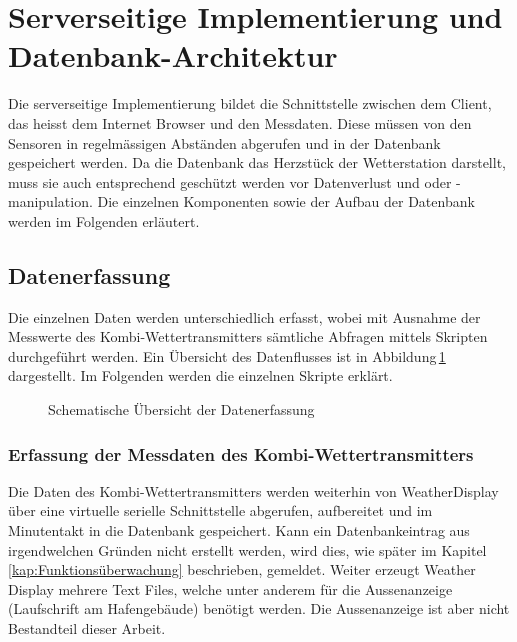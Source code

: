 \section{Serverseitige Implementierung und Datenbank-Architektur}
Die serverseitige Implementierung bildet die Schnittstelle zwischen dem Client, das heisst dem Internet Browser und den Messdaten. Diese müssen von den Sensoren in regelmässigen Abständen abgerufen und in der Datenbank gespeichert werden. Da die Datenbank das Herzstück der Wetterstation darstellt, muss sie auch entsprechend geschützt werden vor Datenverlust und oder -manipulation. Die einzelnen Komponenten sowie der Aufbau der Datenbank werden im Folgenden erläutert.

\subsection{Datenerfassung}
Die einzelnen Daten werden unterschiedlich erfasst, wobei mit Ausnahme der Messwerte des Kombi-Wettertransmitters sämtliche Abfragen mittels Skripten durchgeführt werden. Ein Übersicht des Datenflusses ist in Abbildung\,\ref{img:datenerfassung} dargestellt. Im Folgenden werden die einzelnen Skripte erklärt.

\begin{figure}[htbp!]
	\centering
	\caption{Schematische Übersicht der Datenerfassung}
	\label{img:datenerfassung}
\end{figure}


\subsubsection{Erfassung der Messdaten des Kombi-Wettertransmitters}
Die Daten des Kombi-Wettertransmitters werden weiterhin von WeatherDisplay über eine virtuelle serielle Schnittstelle abgerufen, aufbereitet und im Minutentakt in die Datenbank gespeichert. Kann ein Datenbankeintrag aus irgendwelchen Gründen nicht erstellt werden, wird dies, wie später im Kapitel\,\ref{kap:Funktionsüberwachung} beschrieben, gemeldet. Weiter erzeugt Weather Display mehrere Text Files, welche unter anderem für die Aussenanzeige (Laufschrift am Hafengebäude) benötigt werden. Die Aussenanzeige ist aber nicht Bestandteil dieser Arbeit.

